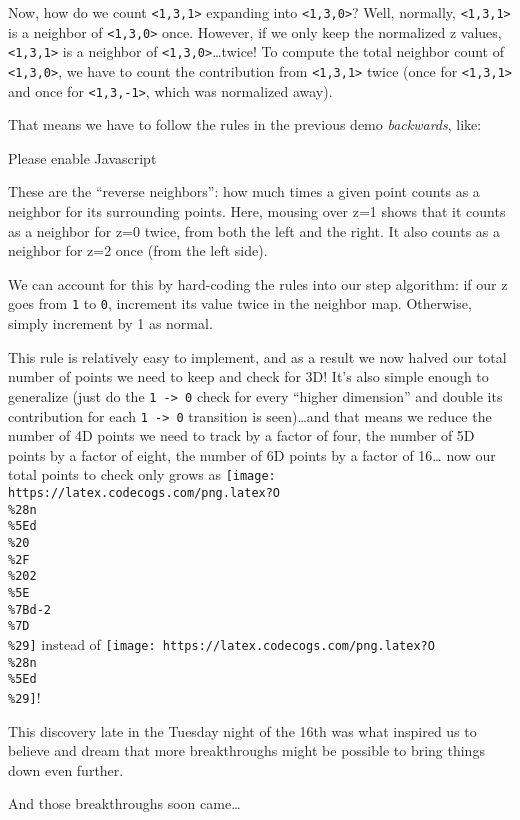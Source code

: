 \documentclass[]{article}
\begin{document}
Now, how do we count \texttt{\textless{}1,3,1\textgreater{}} expanding into
\texttt{\textless{}1,3,0\textgreater{}}? Well, normally,
\texttt{\textless{}1,3,1\textgreater{}} is a neighbor of
\texttt{\textless{}1,3,0\textgreater{}} once. However, if we only keep the
normalized z values, \texttt{\textless{}1,3,1\textgreater{}} is a neighbor of
\texttt{\textless{}1,3,0\textgreater{}}\ldots twice! To compute the total
neighbor count of \texttt{\textless{}1,3,0\textgreater{}}, we have to count the
contribution from \texttt{\textless{}1,3,1\textgreater{}} twice (once for
\texttt{\textless{}1,3,1\textgreater{}} and once for
\texttt{\textless{}1,3,-1\textgreater{}}, which was normalized away).

That means we have to follow the rules in the previous demo \emph{backwards},
like:

\leavevmode\hypertarget{golSyms3DReverse}{}%
Please enable Javascript

These are the ``reverse neighbors'': how much times a given point counts as a
neighbor for its surrounding points. Here, mousing over z=1 shows that it counts
as a neighbor for z=0 twice, from both the left and the right. It also counts as
a neighbor for z=2 once (from the left side).

We can account for this by hard-coding the rules into our step algorithm: if our
z goes from \texttt{1} to \texttt{0}, increment its value twice in the neighbor
map. Otherwise, simply increment by 1 as normal.

This rule is relatively easy to implement, and as a result we now halved our
total number of points we need to keep and check for 3D! It's also simple enough
to generalize (just do the \texttt{1\ -\textgreater{}\ 0} check for every
``higher dimension'' and double its contribution for each
\texttt{1\ -\textgreater{}\ 0} transition is seen)\ldots and that means we
reduce the number of 4D points we need to track by a factor of four, the number
of 5D points by a factor of eight, the number of 6D points by a factor of
16\ldots{} now our total points to check only grows as
\texttt{[image: https://latex.codecogs.com/png.latex?O\\\%28n\\\%5Ed\\\%20\\\%2F\\\%202\\\%5E\\\%7Bd-2\\\%7D\\\%29]}
instead of
\texttt{[image: https://latex.codecogs.com/png.latex?O\\\%28n\\\%5Ed\\\%29]}!

This discovery late in the Tuesday night of the 16th was what inspired us to
believe and dream that more breakthroughs might be possible to bring things down
even further.

And those breakthroughs soon came\ldots{}
\end{document}
